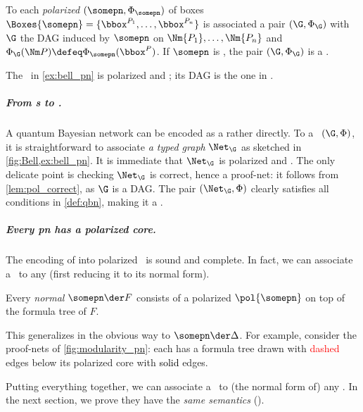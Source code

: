 \begin{lemma}
To each \emph{polarized} \qbpn $(\somepn,\Phi_\somepn)$ of boxes $\Boxes{\somepn}=\{\bbox^{P_1}, \dots, \bbox^{P_n}\}$ is associated a pair $(\G, \Phi_\G)$ with $\G$ the DAG induced by $\somepn$ on $\Nm{P_1}, \dots, \Nm{P_n}$ and $\Phi_\G(\Nm P)\defeq \Phi_\somepn(\bbox^P)$.
If $\somepn$ is \good, the pair $(\G, \Phi_\G)$ is a \QBN.
\end{lemma}
 
\begin{example}
The \pn\ in \cref{ex:bell_pn} is polarized and \good; its DAG is the one in .
\end{example}


\subparagraph{From \qqbn s to \qpns.}

A quantum Bayesian network can be encoded as a \qpn rather directly.
To a \qqbn\ $(\G, \Phi)$, it is straightforward to associate \emph{a typed graph} $\Net_\G$ as sketched in \cref{fig:Bell,ex:bell_pn}.
It is immediate that $\Net_\G$ is polarized and \good.
The only delicate point is checking $\Net_\G$ is correct, hence a proof-net: it follows from \cref{lem:pol_correct}, as $\G$ is a DAG.
The pair $(\Net_\G, \Phi)$ clearly satisfies all conditions in \cref{def:qbn}, making it a \qbpn.

\subparagraph{Every pn has a polarized core.}

The encoding of \QBNs into polarized \good\ \qpns is sound and complete.
In fact, we can associate a \QBN\ to any \good \qpn (first reducing it to its normal form).

\begin{proposition}
Every \emph{normal} \pn $\somepn \der F$ consists of a polarized \pn $\pol{\somepn}$ on top of the formula tree of $F$.
\end{proposition}
This generalizes in the obvious way to $\somepn \der \Delta$.
For example, consider the proof-nets of \cref{fig:modularity_pn}: each has a formula tree drawn with \textcolor{red}{dashed} edges below its polarized core with \textcolor{black}{solid} edges.

Putting everything together, we can associate a \qqbn\ to (the normal form of) any \good \qbpn.
In the next section, we prove they have the \emph{same semantics} ().

